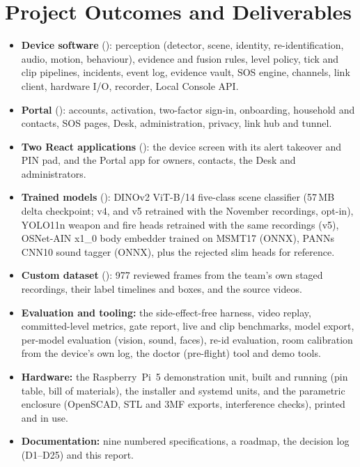 \section{Project Outcomes and Deliverables}
\label{sec:deliverables}
\begin{itemize}
\item \textbf{Device software} (): perception (detector, scene, identity, re-identification, audio, motion, behaviour), evidence and fusion rules, level policy, tick and clip pipelines, incidents, event log, evidence vault, SOS engine, channels, link client, hardware I/O, recorder, Local Console API.
\item \textbf{Portal} (): accounts, activation, two-factor sign-in, onboarding, household and contacts, SOS pages, Desk, administration, privacy, link hub and tunnel.
\item \textbf{Two React applications} (): the device screen with its alert takeover and PIN pad, and the Portal app for owners, contacts, the Desk and administrators.
\item \textbf{Trained models} (): DINOv2 ViT-B/14 five-class scene classifier (57\,MB delta checkpoint; v4, and v5 retrained with the November recordings, opt-in), YOLO11n weapon and fire heads retrained with the same recordings (v5), OSNet-AIN x1\_0 body embedder trained on MSMT17 (ONNX), PANNs CNN10 sound tagger (ONNX), plus the rejected slim heads for reference.
\item \textbf{Custom dataset} (): 977 reviewed frames from the team's own staged recordings, their label timelines and boxes, and the source videos.
\item \textbf{Evaluation and tooling:} the side-effect-free harness, video replay, committed-level metrics, gate report, live and clip benchmarks, model export, per-model evaluation (vision, sound, faces), re-id evaluation, room calibration from the device's own log, the doctor (pre-flight) tool and demo tools.
\item \textbf{Hardware:} the Raspberry~Pi~5 demonstration unit, built and running (pin table, bill of materials), the  installer and systemd units, and the parametric enclosure (OpenSCAD, STL and 3MF exports, interference checks), printed and in use.
\item \textbf{Documentation:} nine numbered specifications, a roadmap, the decision log (D1--D25) and this report.
\end{itemize}

